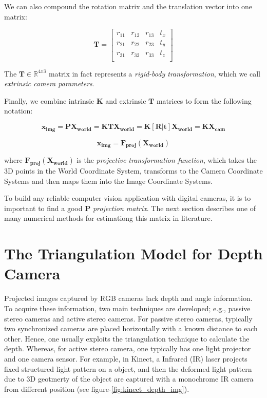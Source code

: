 \documentclass[a4paper]{report}
\numberwithin{figure}{section}
\newcommand{\R}{\mathbb{R}}
\begin{document}
We can also compound the rotation matrix and the translation vector into 
one matrix:

\begin{equation}
  \mathbf{T} =
  \begin{bmatrix}
    r_{11} & r_{12} & r_{13} & t_x\\
    r_{21} & r_{22} & r_{23} & t_y\\
    r_{31} & r_{32} & r_{33} & t_z\\
  \end{bmatrix}
\end{equation} \label{eq:transformation_matrix}

The $\mathbf{T} \in \R^{4x3}$ matrix in fact represents 
a \textit{rigid-body transformation}, which we call 
\textit{extrinsic camera parameters}.

Finally, we combine intrinsic $\mathbf{K}$ and 
extrinsic $\mathbf{T}$ matrices to form the following notation: 

\begin{equation}
  \mathbf{x_{img}} = 
  \mathbf{P}\mathbf{X_{world}} = 
  \mathbf{K}\mathbf{T}\mathbf{X_{world}} = 
  \mathbf{K}[\mathbf{R}|\mathbf{t}]\mathbf{X_{world}} =
  \mathbf{K}\mathbf{X_{cam}}
\end{equation} \label{eq:simplyfied_proj_func_1}

\begin{equation}
  \mathbf{x_{img}} = \mathbf{F_{proj}}(\mathbf{X_{world}})
\end{equation} \label{eq:simplyfied_proj_func_2}

where $\mathbf{F_{proj}}(\mathbf{X_{world}})$ is the 
\textit{projective transformation function}, which takes 
the 3D points in the World Coordinate System, transforms to 
the Camera Coordinate Systems and then maps them into the Image 
Coordinate Systems.

To build any reliable computer vision application with digital cameras, it is 
to important to find a good $\mathbf{P}$ \textit{projection matrix}. 
The next section describes one of many numerical methods for estimationg this 
matrix in literature.

\section{The Triangulation Model for Depth Camera} \label{sc_depth_model}

Projected images captured by RGB cameras lack depth and angle 
information. To acquire these information, two main techniques are developed; 
e.g., passive stereo cameras and active stereo cameras. For passive stereo cameras, 
typically two synchronized cameras are placed horizontally with a known distance to each other. 
Hence, one usually exploits the triangulation technique to calculate the depth. 
Whereas, for active stereo camera, one typically has one light projector and 
one camera sensor. For example, in Kinect, a Infrared (IR) laser projects 
fixed structured light pattern on a object, and then 
the deformed light pattern due to 3D geotmerty of the object are 
captured with a monochrome IR camera from different 
position (see figure-\ref{fig:kinect_depth_img}). 
\end{document}

